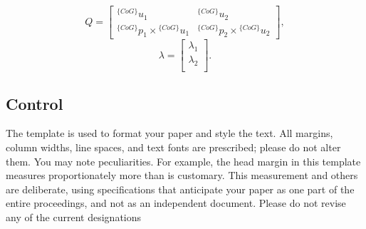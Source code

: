     \begin{equation}
    Q =
    \begin{bmatrix}
    {}^{\{CoG\}}u_1 & {}^{\{CoG\}}u_{2} \\
    {}^{\{CoG\}}p_1 \times {}^{\{CoG\}}u_1 & {}^{\{CoG\}}p_{2} \times {}^{\{CoG\}}u_{2}
    \end{bmatrix},
    \end{equation}
    \begin{equation}
    \lambda =
    \begin{bmatrix}
    \lambda_1 \\
    \lambda_2 \\
    \end{bmatrix}.
    \end{equation}
    

\subsection{Control}


The template is used to format your paper and style the text. All margins, column widths, line spaces, and text fonts are prescribed; please do not alter them. You may note peculiarities. For example, the head margin in this template measures proportionately more than is customary. This measurement and others are deliberate, using specifications that anticipate your paper as one part of the entire proceedings, and not as an independent document. Please do not revise any of the current designations
